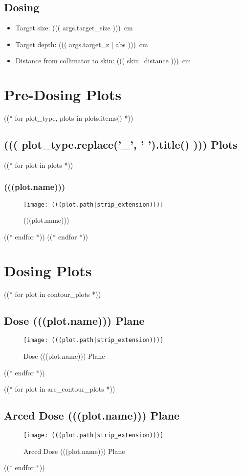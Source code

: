\documentclass[12pt]{article}
\begin{document}
\subsection{Dosing}
\begin{itemize}
	\item Target size: \SI{((( args.target_size )))}{\cm}
	\item Target depth: \SI{((( args.target_z | abs )))}{\cm}
	\item Distance from collimator to skin: \SI{((( skin_distance )))}{\cm}
\end{itemize}
	
\section{Pre-Dosing Plots}
((* for plot_type, plots in plots.items() *))
	\subsection{((( plot_type.replace('_', ' ').title() ))) Plots}
		((* for plot in plots *))
			\subsubsection{(((plot.name)))}
			\begin{figure}[H]
			\centering
			\texttt{[image: (((plot.path|strip\_extension)))]}
			\caption{(((plot.name)))}
			\label{fig:(((plot.slug)))}
			\end{figure}
		((* endfor *))
((* endfor *))

\section{Dosing Plots}


((* for plot in contour_plots *))
	\subsection{Dose (((plot.name))) Plane}
	\begin{figure}[H]
	\centering
	\texttt{[image: (((plot.path|strip\_extension)))]}
	\caption{Dose (((plot.name))) Plane}
	\label{fig:(((plot.slug)))}
	\end{figure}
((* endfor *))


((* for plot in arc_contour_plots *))
	\subsection{Arced Dose (((plot.name))) Plane}
	\begin{figure}[H]
	\centering
	\texttt{[image: (((plot.path|strip\_extension)))]}
	\caption{Arced Dose (((plot.name))) Plane}
	\label{fig:(((plot.slug)))}
	\end{figure}
((* endfor *))
\end{document}
